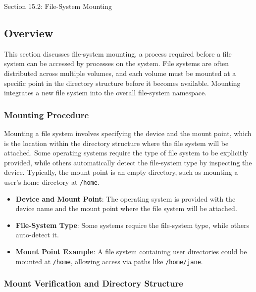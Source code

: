 \begin{notes}{Section 15.2: File-System Mounting}
    \subsection*{Overview}

    This section discusses file-system mounting, a process required before a file system can be accessed by processes on the system. File systems are often distributed across multiple volumes, and each 
    volume must be mounted at a specific point in the directory structure before it becomes available. Mounting integrates a new file system into the overall file-system namespace.
    
    \subsubsection*{Mounting Procedure}
    
    Mounting a file system involves specifying the device and the mount point, which is the location within the directory structure where the file system will be attached. Some operating systems require 
    the type of file system to be explicitly provided, while others automatically detect the file-system type by inspecting the device. Typically, the mount point is an empty directory, such as mounting 
    a user's home directory at \texttt{/home}.
    
    \begin{highlight}
    
        \begin{itemize}
            \item \textbf{Device and Mount Point}: The operating system is provided with the device name and the mount point where the file system will be attached.
            \item \textbf{File-System Type}: Some systems require the file-system type, while others auto-detect it.
            \item \textbf{Mount Point Example}: A file system containing user directories could be mounted at \texttt{/home}, allowing access via paths like \texttt{/home/jane}.
        \end{itemize}
    
    \end{highlight}
    
    \subsubsection*{Mount Verification and Directory Structure}
    

\end{notes}
